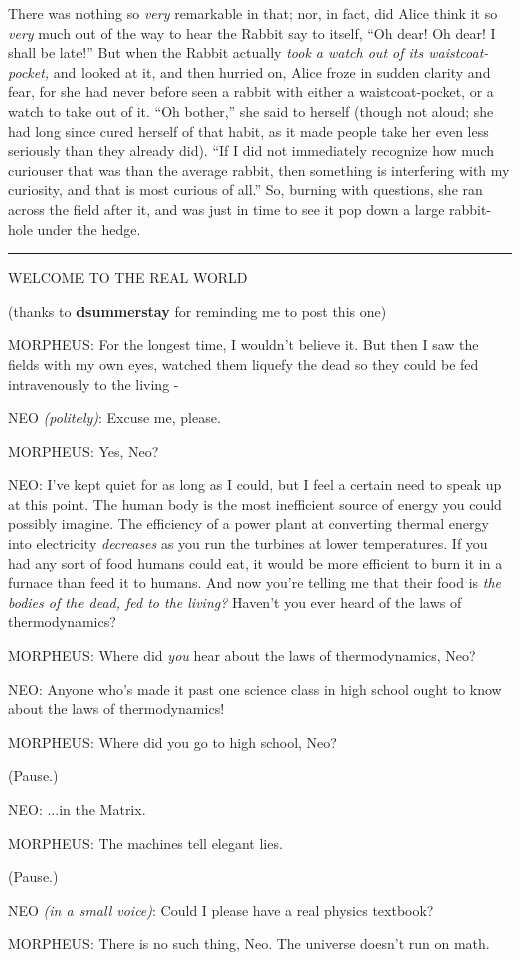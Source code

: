 There was nothing so \emph{very} remarkable in that; nor, in fact, did
Alice think it so \emph{very} much out of the way to hear the Rabbit say
to itself, ``Oh dear! Oh dear! I shall be late!'' But when the Rabbit
actually \emph{took a watch out of its waistcoat- pocket,} and looked at
it, and then hurried on, Alice froze in sudden clarity and fear, for she
had never before seen a rabbit with either a waistcoat-pocket, or a
watch to take out of it. ``Oh bother,'' she said to herself (though not
aloud; she had long since cured herself of that habit, as it made people
take her even less seriously than they already did). ``If I did not
immediately recognize how much curiouser that was than the average
rabbit, then something is interfering with my curiosity, and that is
most curious of all.'' So, burning with questions, she ran across the
field after it, and was just in time to see it pop down a large
rabbit-hole under the hedge.

\begin{center}\rule{3in}{0.4pt}\end{center}

WELCOME TO THE REAL WORLD

(thanks to \textbf{dsummerstay} for reminding me to post this one)

MORPHEUS: For the longest time, I wouldn't believe it. But then I saw
the fields with my own eyes, watched them liquefy the dead so they could
be fed intravenously to the living -

NEO \emph{(politely)}: Excuse me, please.

MORPHEUS: Yes, Neo?

NEO: I've kept quiet for as long as I could, but I feel a certain need
to speak up at this point. The human body is the most inefficient source
of energy you could possibly imagine. The efficiency of a power plant at
converting thermal energy into electricity \emph{decreases} as you run
the turbines at lower temperatures. If you had any sort of food humans
could eat, it would be more efficient to burn it in a furnace than feed
it to humans. And now you're telling me that their food is \emph{the
bodies of the dead, fed to the living?} Haven't you ever heard of the
laws of thermodynamics?

MORPHEUS: Where did \emph{you} hear about the laws of thermodynamics,
Neo?

NEO: Anyone who's made it past one science class in high school ought to
know about the laws of thermodynamics!

MORPHEUS: Where did you go to high school, Neo?

(Pause.)

NEO: ...in the Matrix.

MORPHEUS: The machines tell elegant lies.

(Pause.)

NEO \emph{(in a small voice)}: Could I please have a real physics
textbook?

MORPHEUS: There is no such thing, Neo. The universe doesn't run on math.

